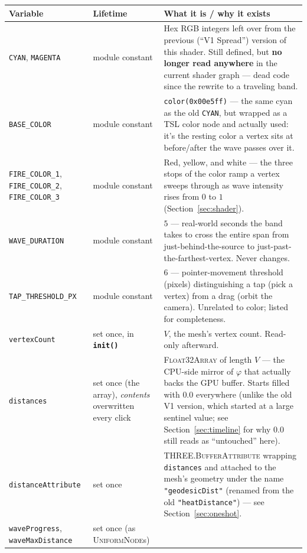 \documentclass[11pt]{article}
\newcommand{\code}[1]{\texttt{#1}}
\newcommand{\func}[1]{\texttt{\textbf{#1}}}
\newcommand{\type}[1]{\textsc{#1}}
\begin{document}
\begin{center}
\small
\renewcommand{\arraystretch}{1.35}
\begin{tabular}{@{}p{2.6cm}p{2.6cm}p{9cm}@{}}
\toprule
\textbf{Variable} & \textbf{Lifetime} & \textbf{What it is / why it exists} \\
\midrule
\code{CYAN}, \code{MAGENTA} & module constant & Hex RGB integers left over from the
  previous (``V1 Spread'') version of this shader. Still defined, but \textbf{no longer
  read anywhere} in the current shader graph --- dead code since the rewrite to a
  traveling band. \\
\code{BASE\_COLOR} & module constant & \code{color(0x00e5ff)} --- the same cyan as the old
  \code{CYAN}, but wrapped as a TSL color node and actually used: it's the resting color a
  vertex sits at before/after the wave passes over it. \\
\code{FIRE\_COLOR\_1}, \code{FIRE\_COLOR\_2}, \code{FIRE\_COLOR\_3} & module constant &
  Red, yellow, and white --- the three stops of the color ramp a vertex sweeps through as
  wave intensity rises from $0$ to $1$ (Section~\ref{sec:shader}). \\
\code{WAVE\_DURATION} & module constant & $5$ --- real-world seconds the band takes to
  cross the entire span from just-behind-the-source to just-past-the-farthest-vertex.
  Never changes. \\
\code{TAP\_THRESHOLD\_PX} & module constant & $6$ --- pointer-movement threshold (pixels)
  distinguishing a tap (pick a vertex) from a drag (orbit the camera). Unrelated to color;
  listed for completeness. \\
\midrule
\code{vertexCount} & set once, in \func{init()} & $V$, the mesh's vertex count. Read-only
  afterward. \\
\code{distances} & set once (the array), \emph{contents} overwritten every click &
  \type{Float32Array} of length $V$ --- the CPU-side mirror of $\varphi$ that actually
  backs the GPU buffer. Starts filled with $0.0$ everywhere (unlike the old V1 version,
  which started at a large sentinel value; see Section~\ref{sec:timeline} for why $0.0$
  still reads as ``untouched'' here). \\
\code{distanceAttribute} & set once & \type{THREE.BufferAttribute} wrapping \code{distances}
  and attached to the mesh's geometry under the name \code{"geodesicDist"} (renamed from
  the old \code{"heatDistance"}) --- see Section~\ref{sec:oneshot}. \\
\code{waveProgress}, \code{waveMaxDistance} & set once (as \type{UniformNode}s) &

\end{tabular}
\end{center}
\end{document}
